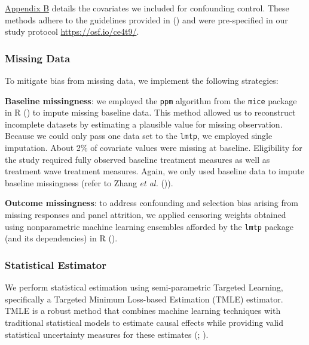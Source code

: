\documentclass[
  single column]{article}
\begin{document}
\hyperref[appendix-demographics]{Appendix B} details the covariates we
included for confounding control. These methods adhere to the guidelines
provided in () and
were pre-specified in our study protocol \url{https://osf.io/ce4t9/}.

\subsubsection{Missing Data}\label{missing-data}

To mitigate bias from missing data, we implement the following
strategies:

\textbf{Baseline missingness}: we employed the \texttt{ppm} algorithm
from the \texttt{mice} package in R () to impute missing baseline data. This method allowed us to
reconstruct incomplete datasets by estimating a plausible value for
missing observation. Because we could only pass one data set to the
\texttt{lmtp}, we employed single imputation. About 2\% of covariate
values were missing at baseline. Eligibility for the study required
fully observed baseline treatment measures as well as treatment wave
treatment measures. Again, we only used baseline data to impute baseline
missingness (refer to Zhang \emph{et al.}
()).

\textbf{Outcome missingness}: to address confounding and selection bias
arising from missing responses and panel attrition, we applied censoring
weights obtained using nonparametric machine learning ensembles afforded
by the \texttt{lmtp} package (and its dependencies) in R
().

\subsubsection{Statistical Estimator}\label{statistical-estimator}

We perform statistical estimation using semi-parametric Targeted
Learning, specifically a Targeted Minimum Loss-based Estimation (TMLE)
estimator. TMLE is a robust method that combines machine learning
techniques with traditional statistical models to estimate causal
effects while providing valid statistical uncertainty measures for these
estimates (;
).
\end{document}
